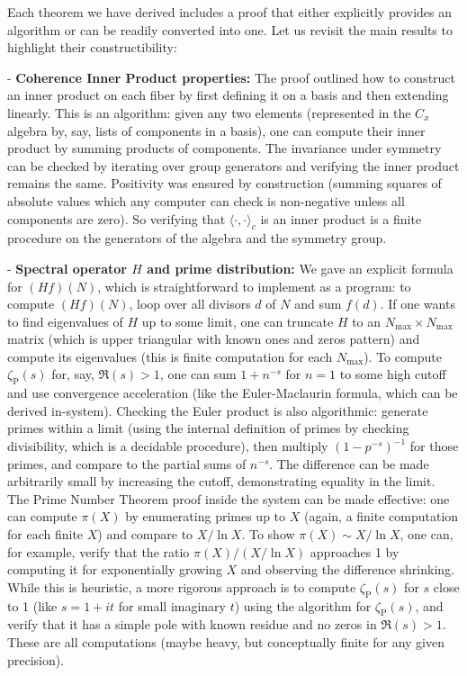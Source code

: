 \documentclass[11pt]{article}
\begin{document}
Each theorem we have derived includes a proof that either explicitly provides an algorithm or can be readily converted into one. Let us revisit the main results to highlight their constructibility:

- \textbf{Coherence Inner Product properties:} The proof outlined how to construct an inner product on each fiber by first defining it on a basis and then extending linearly. This is an algorithm: given any two elements (represented in the $C_x$ algebra by, say, lists of components in a basis), one can compute their inner product by summing products of components. The invariance under symmetry can be checked by iterating over group generators and verifying the inner product remains the same. Positivity was ensured by construction (summing squares of absolute values which any computer can check is non-negative unless all components are zero). So verifying that $\langle\cdot,\cdot\rangle_c$ is an inner product is a finite procedure on the generators of the algebra and the symmetry group.

- \textbf{Spectral operator $H$ and prime distribution:} We gave an explicit formula for $(Hf)(N)$, which is straightforward to implement as a program: to compute $(Hf)(N)$, loop over all divisors $d$ of $N$ and sum $f(d)$. If one wants to find eigenvalues of $H$ up to some limit, one can truncate $H$ to an $N_{\max}\times N_{\max}$ matrix (which is upper triangular with known ones and zeros pattern) and compute its eigenvalues (this is finite computation for each $N_{\max}$). To compute $\zeta_{\mathrm{P}}(s)$ for, say, $\Re(s)>1$, one can sum $1+n^{-s}$ for $n=1$ to some high cutoff and use convergence acceleration (like the Euler-Maclaurin formula, which can be derived in-system). Checking the Euler product is also algorithmic: generate primes within a limit (using the internal definition of primes by checking divisibility, which is a decidable procedure), then multiply $(1-p^{-s})^{-1}$ for those primes, and compare to the partial sums of $n^{-s}$. The difference can be made arbitrarily small by increasing the cutoff, demonstrating equality in the limit. The Prime Number Theorem proof inside the system can be made effective: one can compute $\pi(X)$ by enumerating primes up to $X$ (again, a finite computation for each finite $X$) and compare to $X/\ln X$. To show $\pi(X) \sim X/\ln X$, one can, for example, verify that the ratio $\pi(X) / (X/\ln X)$ approaches 1 by computing it for exponentially growing $X$ and observing the difference shrinking. While this is heuristic, a more rigorous approach is to compute $\zeta_{\mathrm{P}}(s)$ for $s$ close to 1 (like $s = 1 + i t$ for small imaginary $t$) using the algorithm for $\zeta_{\mathrm{P}}(s)$, and verify that it has a simple pole with known residue and no zeros in $\Re(s)>1$. These are all computations (maybe heavy, but conceptually finite for any given precision).
\end{document}
